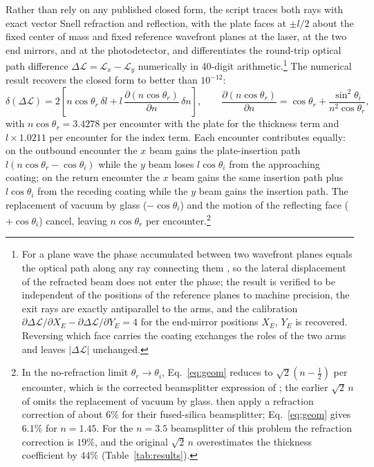Rather than rely on any published closed form, the script traces both rays with exact vector Snell refraction and reflection, with the plate faces at $\pm l/2$ about the fixed center of mass and fixed reference wavefront planes at the laser, at the two end mirrors, and at the photodetector, and differentiates the round-trip optical path difference $\Delta\mathcal L=\mathcal L_x-\mathcal L_y$ numerically in 40-digit arithmetic.\footnote{For a plane wave the phase accumulated between two wavefront planes equals the optical path along any ray connecting them \citep[theorem of Malus and Dupin, Sec.~3.3.3]{BornWolf1999}, so the lateral displacement of the refracted beam does not enter the phase; the result is verified to be independent of the positions of the reference planes to machine precision, the exit rays are exactly antiparallel to the arms, and the calibration $\partial\Delta\mathcal L/\partial X_E-\partial\Delta\mathcal L/\partial Y_E=4$ for the end-mirror positions $X_E$, $Y_E$ is recovered. Reversing which face carries the coating exchanges the roles of the two arms and leaves $|\Delta\mathcal L|$ unchanged.} The numerical result recovers the closed form to better than $10^{-12}$:
%
\begin{equation}
\delta(\Delta\mathcal L)=2\left[n\cos\theta_r\,\delta l+l\,\frac{\partial(n\cos\theta_r)}{\partial n}\,\delta n\right],\qquad
\frac{\partial(n\cos\theta_r)}{\partial n}=\cos\theta_r+\frac{\sin^2\theta_i}{n^2\cos\theta_r},
\label{eq:geom}
\end{equation}
%
with $n\cos\theta_r=3.4278$ per encounter with the plate for the thickness term and $l\times1.0211$ per encounter for the index term. Each encounter contributes equally: on the outbound encounter the $x$ beam gains the plate-insertion path $l(n\cos\theta_r-\cos\theta_i)$ while the $y$ beam loses $l\cos\theta_i$ from the approaching coating; on the return encounter the $x$ beam gains the same insertion path plus $l\cos\theta_i$ from the receding coating while the $y$ beam gains the insertion path. The replacement of vacuum by glass ($-\cos\theta_i$) and the motion of the reflecting face ($+\cos\theta_i$) cancel, leaving $n\cos\theta_r$ per encounter.\footnote{In the no-refraction limit $\theta_r\to\theta_i$, Eq.~\eqref{eq:geom} reduces to $\sqrt2(n-\tfrac12)$ per encounter, which is the corrected beamsplitter expression of \citet[Eq.~5]{Vermeulen2021}; the earlier $\sqrt2\,n$ of \citet[Eq.~17]{GroteStadnik2019} omits the replacement of vacuum by glass. \citet{Vermeulen2021} then apply a refraction correction of about $6\%$ for their fused-silica beamsplitter; Eq.~\eqref{eq:geom} gives $6.1\%$ for $n=1.45$. For the $n=3.5$ beamsplitter of this problem the refraction correction is $19\%$, and the original $\sqrt2\,n$ overestimates the thickness coefficient by $44\%$ (Table~\ref{tab:results}).}

